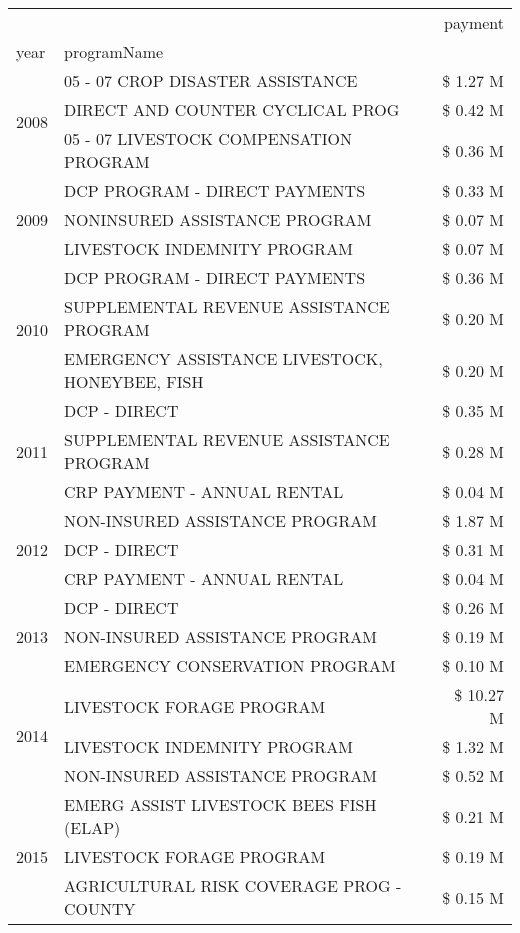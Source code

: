 \begin{tabular}{llr}
\toprule
 &  & payment \\
year & programName &  \\
\midrule
\multirow[t]{3}{*}{2008} & 05 - 07 CROP DISASTER ASSISTANCE & \$ 1.27 M \\
 & DIRECT AND COUNTER CYCLICAL PROG & \$ 0.42 M \\
 & 05 - 07 LIVESTOCK COMPENSATION PROGRAM & \$ 0.36 M \\
\cline{1-3}
\multirow[t]{3}{*}{2009} & DCP PROGRAM - DIRECT PAYMENTS & \$ 0.33 M \\
 & NONINSURED ASSISTANCE PROGRAM & \$ 0.07 M \\
 & LIVESTOCK INDEMNITY PROGRAM & \$ 0.07 M \\
\cline{1-3}
\multirow[t]{3}{*}{2010} & DCP PROGRAM - DIRECT PAYMENTS & \$ 0.36 M \\
 & SUPPLEMENTAL REVENUE ASSISTANCE PROGRAM & \$ 0.20 M \\
 & EMERGENCY ASSISTANCE LIVESTOCK, HONEYBEE, FISH & \$ 0.20 M \\
\cline{1-3}
\multirow[t]{3}{*}{2011} & DCP - DIRECT & \$ 0.35 M \\
 & SUPPLEMENTAL REVENUE ASSISTANCE PROGRAM & \$ 0.28 M \\
 & CRP PAYMENT - ANNUAL RENTAL & \$ 0.04 M \\
\cline{1-3}
\multirow[t]{3}{*}{2012} & NON-INSURED ASSISTANCE PROGRAM & \$ 1.87 M \\
 & DCP - DIRECT & \$ 0.31 M \\
 & CRP PAYMENT - ANNUAL RENTAL & \$ 0.04 M \\
\cline{1-3}
\multirow[t]{3}{*}{2013} & DCP - DIRECT & \$ 0.26 M \\
 & NON-INSURED ASSISTANCE PROGRAM & \$ 0.19 M \\
 & EMERGENCY CONSERVATION PROGRAM & \$ 0.10 M \\
\cline{1-3}
\multirow[t]{3}{*}{2014} & LIVESTOCK FORAGE PROGRAM & \$ 10.27 M \\
 & LIVESTOCK INDEMNITY PROGRAM & \$ 1.32 M \\
 & NON-INSURED ASSISTANCE PROGRAM & \$ 0.52 M \\
\cline{1-3}
\multirow[t]{3}{*}{2015} & EMERG ASSIST LIVESTOCK BEES FISH (ELAP) & \$ 0.21 M \\
 & LIVESTOCK FORAGE PROGRAM & \$ 0.19 M \\
 & AGRICULTURAL RISK COVERAGE PROG - COUNTY & \$ 0.15 M \\
\cline{1-3}

\end{tabular}
